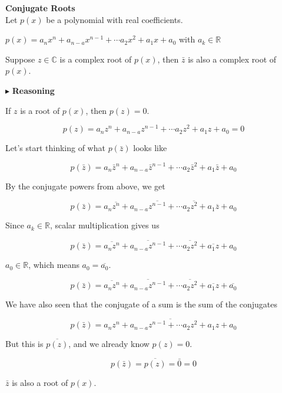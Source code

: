 \documentclass{ximera}
\begin{document}
\begin{theorem} \textbf{\textcolor{blue!55!black}{Conjugate Roots}}   \\



Let $p(x)$ be a polynomial with real coefficients.

$p(x) = a_n x^n + a_{n-a} x^{n-1} + \cdots a_2 x^2 + a_1 x + a_0$   with $a_k \in \mathbb{R}$

Suppose $z \in \mathbb{C}$ is a complex root of $p(x)$, then $\bar{z}$ is also a complex root of $p(x)$.


\end{theorem}







$\blacktriangleright$ \textbf{Reasoning}




If $z$ is a root of $p(x)$, then $p(z) = 0$.


\[    p(z) = a_n z^n + a_{n-a} z^{n-1} + \cdots a_2 z^2 + a_1 z + a_0  = 0   \]


Let's start thinking of what $p(\bar{z})$ looks like



\[    p(\bar{z}) = a_n \bar{z}^n + a_{n-a} \bar{z}^{n-1} + \cdots a_2 \bar{z}^2 + a_1 \bar{z} + a_0    \]


By the conjugate powers from above, we get 


\[    p(\bar{z}) = a_n \overline{z^n} + a_{n-a} \overline{z^{n-1}} + \cdots a_2 \overline{z^2} + a_1 \overline{z} + a_0    \]



Since $a_k \in \mathbb{R}$, scalar multiplication gives us




\[    p(\bar{z}) = \overline{a_n z^n} +  \overline{a_{n-a} z^{n-1}} + \cdots  \overline{a_2 z^2} +  \overline{a_1 z} + a_0    \]



$a_0 \in \mathbb{R}$, which means $a_0 = \overline{a_0}$.



\[    p(\bar{z}) = \overline{a_n z^n} +  \overline{a_{n-a} z^{n-1}} + \cdots  \overline{a_2 z^2} +  \overline{a_1 z} + \overline{a_0}    \]





We have also seen that the conjugate of a sum is the sum of the conjugates


\[    p(\bar{z}) = \overline{a_n z^n + a_{n-a} z^{n-1} + \cdots  a_2 z^2 +  a_1 z + a_0}   \]



But this is $\overline{p(z)}$, and we already know  $p(z) = 0$.



\[    p(\bar{z}) = \overline{p(z)} = \bar{0} = 0  \]


$\bar{z}$ is also a root of $p(x)$.
\end{document}
